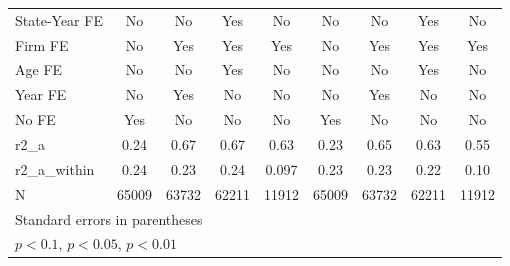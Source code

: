 {\begin{tabular}{l*{8}{c}}
\addlinespace
State-Year FE       &          No         &          No         &         Yes         &          No         &          No         &          No         &         Yes         &          No         \\
\addlinespace
Firm FE             &          No         &         Yes         &         Yes         &         Yes         &          No         &         Yes         &         Yes         &         Yes         \\
\addlinespace
Age FE              &          No         &          No         &         Yes         &          No         &          No         &          No         &         Yes         &          No         \\
\addlinespace
Year FE             &          No         &         Yes         &          No         &          No         &          No         &         Yes         &          No         &          No         \\
\addlinespace
No FE               &         Yes         &          No         &          No         &          No         &         Yes         &          No         &          No         &          No         \\
\midrule
r2\_a                &        0.24         &        0.67         &        0.67         &        0.63         &        0.23         &        0.65         &        0.63         &        0.55         \\
r2\_a\_within         &        0.24         &        0.23         &        0.24         &       0.097         &        0.23         &        0.23         &        0.22         &        0.10         \\
N                   &       65009         &       63732         &       62211         &       11912         &       65009         &       63732         &       62211         &       11912         \\
\bottomrule
\multicolumn{9}{l}{\footnotesize Standard errors in parentheses}\\
\multicolumn{9}{l}{\footnotesize \sym{*} \(p<0.1\), \sym{**} \(p<0.05\), \sym{***} \(p<0.01\)}\\
\end{tabular}
}
